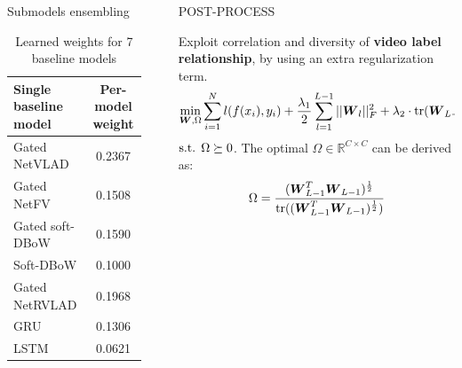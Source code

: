 \documentclass[final]{beamer}
\newlength{\sepwidth}
\newlength{\colwidth}
\newcommand{\separatorcolumn}{\begin{column}{\sepwidth}\end{column}}
\begin{document}
\begin{frame}[t]
\begin{columns}[t]
\begin{column}{\colwidth}
\begin{alertblock}{Submodels ensembling}
\begin{table}[h!]
  	\begin{center}
    \begin{tabular}{ l | c }
    \toprule
    \textbf{Single baseline model} & \textbf{Per-model weight} \\
    \midrule
            Gated NetVLAD & 0.2367 \\
    \hline
            Gated NetFV & 0.1508 \\
    \hline
            Gated soft-DBoW & 0.1590 \\
    \hline
            Soft-DBoW & 0.1000 \\
    \hline
            Gated NetRVLAD & 0.1968\\
    \hline
            GRU & 0.1306 \\
    \hline
            LSTM & 0.0621 \\
    \bottomrule
    \end{tabular}
    \caption{Learned weights for 7 baseline models}
    \label{tab:learned_weights}
  	\end{center}
\end{table}
    
    \end{alertblock}

\end{column}

\separatorcolumn


\begin{column}{\colwidth}

  \begin{block}{POST-PROCESS}

    Exploit correlation and diversity of \textbf{video label relationship}, by using an extra regularization term.
\begin{equation}
\min_{\boldsymbol{W}, \Omega}\sum_{i=1}^{N}l(f(x_i),y_i) +\frac{\lambda_{1}}{2}\sum_{l=1}^{L-1}||\boldsymbol{W}_l||_F^2 + \lambda_{2}\cdot \textnormal{tr}(\boldsymbol{W}_{L-1}\Omega^{-1}\boldsymbol{W}_{L-1}^{T}) 
\end{equation}
$\textnormal{s.t. } \Omega\succeq0$.
The optimal $\Omega \in \mathbb{R}^{C \times C}$ can be derived as:
\begin{equation}
\Omega = \frac{(\boldsymbol{W}_{L-1}^T \boldsymbol{W}_{L-1})^\frac{1}{2}}{\textnormal{tr}((\boldsymbol{W}_{L-1}^T \boldsymbol{W}_{L-1})^\frac{1}{2})}
\end{equation}




\end{block}
\end{column}
\end{columns}
\end{frame}
\end{document}
